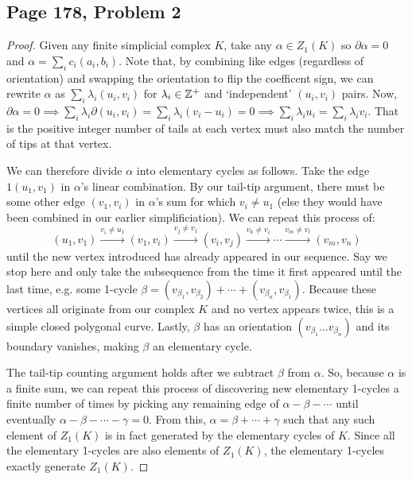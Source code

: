 \usetikzlibrary{decorations.markings,arrows.meta,bending, patterns}

\subsection*{Page 178, Problem 2}
\vspace{15pt}
\begin{proof}
    \vspace{-10pt}
    Given any finite simplicial complex $K$, take any $\alpha \in Z_1(K)$ so $\partial\alpha = 0$ and $\alpha = \sum\limits_{i}c_i (a_i,b_i)$. Note that, by combining like edges (regardless of orientation) and swapping the orientation to flip the coefficent sign, we can rewrite $\alpha$ as $\sum\limits_{i}\lambda_i (u_i, v_i)$ for $\lambda_i \in \mathbb{Z}^+$ and `independent' $(u_i, v_i)$ pairs. Now, $\partial\alpha = 0 \implies \sum\limits_i\lambda_i\partial(u_i,v_i) = \sum\limits_i\lambda_i(v_i-u_i) = 0 \implies \sum\limits_i\lambda_iu_i = \sum\limits_i\lambda_iv_i$. That is the positive integer number of tails at each vertex must also match the number of tips at that vertex.
    
    We can therefore divide $\alpha$ into elementary cycles as follows. Take the edge $1(u_1,v_1)$ in $\alpha$'s linear combination. By our tail-tip argument, there must be some other edge $(v_1, v_i)$ in $\alpha$'s sum for which $v_i \neq u_1$ (else they would have been combined in our earlier simplificiation). We can repeat this process of:
    \[ 
        (u_1, v_1) \overset{v_i \neq u_1}{\longrightarrow} (v_1, v_i) \overset{v_j \neq v_1}{\longrightarrow} (v_i, v_j) \overset{v_k \neq v_i}{\longrightarrow} \cdots \overset{v_m \neq v_l}{\longrightarrow} (v_m, v_n)
    \]
    until the new vertex introduced has already appeared in our sequence. Say we stop here and only take the subsequence from the time it first appeared until the last time, e.g. some 1-cycle $\beta = (v_{\beta_1},v_{\beta_2}) + \cdots + (v_{\beta_n}, v_{\beta_1})$. Because these vertices all originate from our complex $K$ and no vertex appears twice, this is a simple closed polygonal curve. Lastly, $\beta$ has an orientation $(v_{\beta_1}\ldots v_{\beta_n})$ and its boundary vanishes, making $\beta$ an elementary cycle. 
    
    The tail-tip counting argument holds after we subtract $\beta$ from $\alpha$. So, because $\alpha$ is a finite sum, we can repeat this process of discovering new elementary 1-cycles a finite number of times by picking any remaining edge of $\alpha - \beta -  \cdots $ until eventually $\alpha - \beta - \cdots - \gamma = 0$. From this, $\alpha = \beta + \cdots + \gamma$ such that any such element of $Z_1(K)$ is in fact generated by the elementary cycles of $K$. Since all the elementary 1-cycles are also elements of $Z_1(K)$, the elementary 1-cycles exactly generate $Z_1(K)$.
\end{proof}

